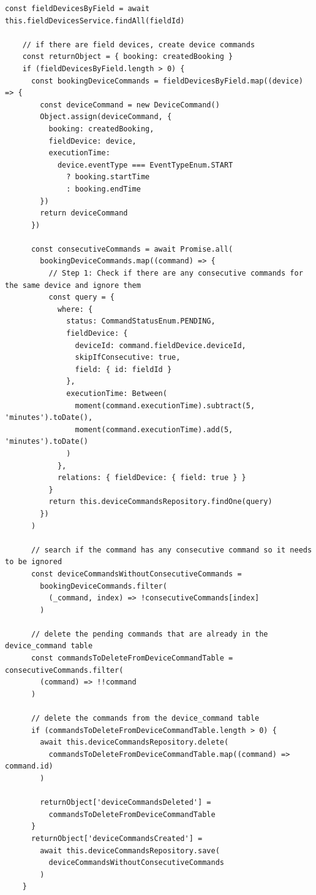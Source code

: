 \begin{lstlisting}[caption={Exemplo de \textit{controller} para \textit{login}.},label={cod:create-booking-service}]
    const fieldDevicesByField = await this.fieldDevicesService.findAll(fieldId)

    // if there are field devices, create device commands
    const returnObject = { booking: createdBooking }
    if (fieldDevicesByField.length > 0) {
      const bookingDeviceCommands = fieldDevicesByField.map((device) => {
        const deviceCommand = new DeviceCommand()
        Object.assign(deviceCommand, {
          booking: createdBooking,
          fieldDevice: device,
          executionTime:
            device.eventType === EventTypeEnum.START
              ? booking.startTime
              : booking.endTime
        })
        return deviceCommand
      })

      const consecutiveCommands = await Promise.all(
        bookingDeviceCommands.map((command) => {
          // Step 1: Check if there are any consecutive commands for the same device and ignore them
          const query = {
            where: {
              status: CommandStatusEnum.PENDING,
              fieldDevice: {
                deviceId: command.fieldDevice.deviceId,
                skipIfConsecutive: true,
                field: { id: fieldId }
              },
              executionTime: Between(
                moment(command.executionTime).subtract(5, 'minutes').toDate(),
                moment(command.executionTime).add(5, 'minutes').toDate()
              )
            },
            relations: { fieldDevice: { field: true } }
          }
          return this.deviceCommandsRepository.findOne(query)
        })
      )

      // search if the command has any consecutive command so it needs to be ignored
      const deviceCommandsWithoutConsecutiveCommands =
        bookingDeviceCommands.filter(
          (_command, index) => !consecutiveCommands[index]
        )

      // delete the pending commands that are already in the device_command table
      const commandsToDeleteFromDeviceCommandTable = consecutiveCommands.filter(
        (command) => !!command
      )

      // delete the commands from the device_command table
      if (commandsToDeleteFromDeviceCommandTable.length > 0) {
        await this.deviceCommandsRepository.delete(
          commandsToDeleteFromDeviceCommandTable.map((command) => command.id)
        )

        returnObject['deviceCommandsDeleted'] =
          commandsToDeleteFromDeviceCommandTable
      }
      returnObject['deviceCommandsCreated'] =
        await this.deviceCommandsRepository.save(
          deviceCommandsWithoutConsecutiveCommands
        )
    }


\end{lstlisting}
